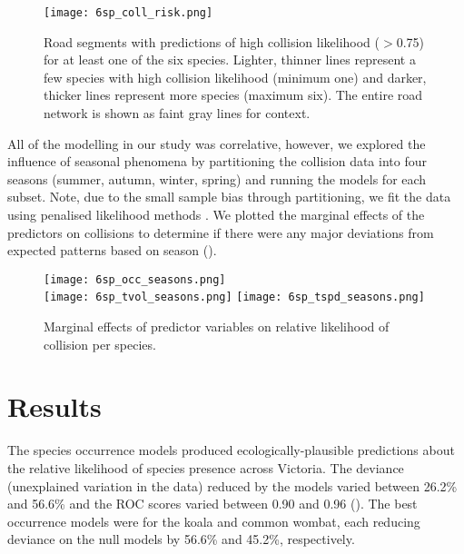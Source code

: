 \begin{figure*}[htp]
  \centering
  \texttt{[image: 6sp\_coll\_risk.png]}
  \caption[]{Road segments with predictions of high collision likelihood ($>$0.75) for at least one of the six species. Lighter, thinner lines represent a few species with high collision likelihood (minimum one) and darker, thicker lines represent more species (maximum six).  The entire road network is shown as faint gray lines for context.}
  \label{6sp_collrisk}
\end{figure*}

All of the modelling in our study was correlative, however, we explored the influence of seasonal phenomena by partitioning the collision data into four seasons (summer, autumn, winter, spring) and running the models for each subset. Note, due to the small sample bias through partitioning, we fit the data using penalised likelihood methods \citep{firt93}.  We plotted the marginal effects of the predictors on collisions to determine if there were any major deviations from expected patterns based on season ().

\begin{figure*}[htp]
  \centering
  \texttt{[image: 6sp\_occ\_seasons.png]}\\
  \texttt{[image: 6sp\_tvol\_seasons.png]}
  \texttt{[image: 6sp\_tspd\_seasons.png]}
  \caption[]{Marginal effects of predictor variables on relative likelihood of collision per species.}
  \label{6sp_seas_effects}
\end{figure*}

\section{Results}

The species occurrence models produced ecologically-plausible predictions about the relative likelihood of species presence across Victoria. The deviance (unexplained variation in the data) reduced by the models varied between 26.2\% and 56.6\% and the ROC scores varied between 0.90 and 0.96 (). The best occurrence models were for the koala and common wombat, each reducing deviance on the null models by 56.6\% and 45.2\%, respectively. 

